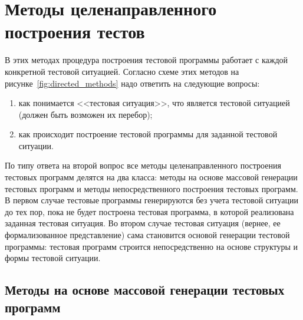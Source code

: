 \section{Методы целенаправленного построения тестов}


В этих методах процедура построения тестовой программы работает с каждой конкретной тестовой ситуацией. Согласно схеме этих методов на рисунке~\ref{fig:directed_methods} надо ответить на следующие вопросы:
\begin{enumerate}
  \item как понимается <<тестовая ситуация>>, что является тестовой ситуацией (должен быть возможен их перебор);
  \item как происходит построение тестовой программы для заданной тестовой ситуации.
\end{enumerate}

По типу ответа на второй вопрос все методы целенаправленного построения тестовых программ делятся на два класса: методы на основе массовой генерации тестовых программ и методы непосредственного построения тестовых программ. В первом случае тестовые программы генерируются без учета тестовой ситуации до тех пор, пока не будет построена тестовая программа, в которой реализована заданная тестовая ситуация. Во втором случае тестовая ситуация (вернее, ее формализованное представление) сама становится основой генерации тестовой программы: тестовая программ строится непосредственно на основе структуры и формы тестовой ситуации.

\subsection{Методы на основе массовой генерации тестовых программ}

